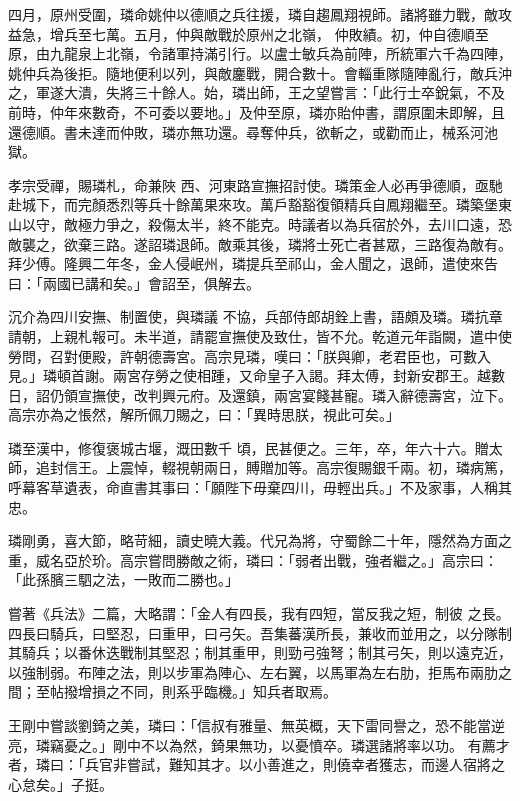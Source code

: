 \begin{pinyinscope}
 四月，原州受圍，璘命姚仲以德順之兵往援，璘自趨鳳翔視師。諸將雖力戰，敵攻益急，增兵至七萬。五月，仲與敵戰於原州之北嶺，
 仲敗績。初，仲自德順至原，由九龍泉上北嶺，令諸軍持滿引行。以盧士敏兵為前陣，所統軍六千為四陣，姚仲兵為後拒。隨地便利以列，與敵鏖戰，開合數十。會輜重隊隨陣亂行，敵兵沖之，軍遂大潰，失將三十餘人。始，璘出師，王之望嘗言：「此行士卒銳氣，不及前時，仲年來數奇，不可委以要地。」及仲至原，璘亦貽仲書，謂原圍未即解，且還德順。書未達而仲敗，璘亦無功還。尋奪仲兵，欲斬之，或勸而止，械系河池獄。



 孝宗受禪，賜璘札，命兼陜
 西、河東路宣撫招討使。璘策金人必再爭德順，亟馳赴城下，而完顏悉烈等兵十餘萬果來攻。萬戶豁豁復領精兵自鳳翔繼至。璘築堡東山以守，敵極力爭之，殺傷太半，終不能克。時議者以為兵宿於外，去川口遠，恐敵襲之，欲棄三路。遂詔璘退師。敵乘其後，璘將士死亡者甚眾，三路復為敵有。拜少傅。隆興二年冬，金人侵岷州，璘提兵至祁山，金人聞之，退師，遣使來告曰：「兩國已講和矣。」會詔至，俱解去。



 沉介為四川安撫、制置使，與璘議
 不協，兵部侍郎胡銓上書，語頗及璘。璘抗章請朝，上親札報可。未半道，請罷宣撫使及致仕，皆不允。乾道元年詣闕，遣中使勞問，召對便殿，許朝德壽宮。高宗見璘，嘆曰：「朕與卿，老君臣也，可數入見。」璘頓首謝。兩宮存勞之使相踵，又命皇子入謁。拜太傅，封新安郡王。越數日，詔仍領宣撫使，改判興元府。及還鎮，兩宮宴餞甚寵。璘入辭德壽宮，泣下。高宗亦為之悵然，解所佩刀賜之，曰：「異時思朕，視此可矣。」



 璘至漢中，修復褒城古堰，溉田數千
 頃，民甚便之。三年，卒，年六十六。贈太師，追封信王。上震悼，輟視朝兩日，賻贈加等。高宗復賜銀千兩。初，璘病篤，呼幕客草遺表，命直書其事曰：「願陛下毋棄四川，毋輕出兵。」不及家事，人稱其忠。



 璘剛勇，喜大節，略苛細，讀史曉大義。代兄為將，守蜀餘二十年，隱然為方面之重，威名亞於玠。高宗嘗問勝敵之術，璘曰：「弱者出戰，強者繼之。」高宗曰：「此孫臏三駟之法，一敗而二勝也。」



 嘗著《兵法》二篇，大略謂：「金人有四長，我有四短，當反我之短，制彼
 之長。四長曰騎兵，曰堅忍，曰重甲，曰弓矢。吾集蕃漢所長，兼收而並用之，以分隊制其騎兵；以番休迭戰制其堅忍；制其重甲，則勁弓強弩；制其弓矢，則以遠克近，以強制弱。布陣之法，則以步軍為陣心、左右翼，以馬軍為左右肋，拒馬布兩肋之間；至帖撥增損之不同，則系乎臨機。」知兵者取焉。



 王剛中嘗談劉錡之美，璘曰：「信叔有雅量、無英概，天下雷同譽之，恐不能當逆亮，璘竊憂之。」剛中不以為然，錡果無功，以憂憤卒。璘選諸將率以功。
 有薦才者，璘曰：「兵官非嘗試，難知其才。以小善進之，則僥幸者獲志，而邊人宿將之心怠矣。」子挺。




\end{pinyinscope}
